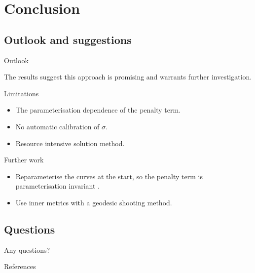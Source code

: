\documentclass{beamer}
\begin{document}
\section{Conclusion}
\subsection{Outlook and suggestions}
\begin{frame}{Outlook}

The results suggest this approach is promising and warrants further investigation.
\vspace{5mm}
\begin{block}{Limitations}
\begin{itemize}
\item The parameterisation dependence of the penalty term.
\item No automatic calibration of $\sigma$.
\item Resource intensive solution method.
\end{itemize}
\end{block}
\end{frame}

\begin{frame}{Further work}
\begin{itemize}
\item Reparameterise the curves at the start, so the penalty term is parameterisation invariant \cite{clark2011reparam}.
\vspace{10mm}
\item Use inner metrics with a geodesic shooting method.
\end{itemize}
\end{frame}

\subsection*{Questions}
\begin{frame}

\begin{figure}
\end{figure}
\centering
\Huge{Any questions?}

\begin{figure}
\end{figure}

\end{frame}

\begin{frame}[allowframebreaks]{References}


\end{frame}
\end{document}
